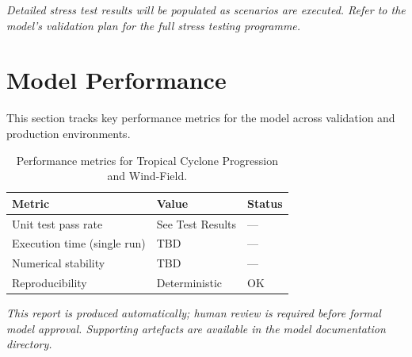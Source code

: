 \documentclass[11pt,a4paper]{article}
\begin{document}
\textit{Detailed stress test results will be populated as scenarios are executed.
Refer to the model's validation plan for the full stress testing programme.}

\section{Model Performance}

This section tracks key performance metrics for the model across
validation and production environments.

\begin{table}[H]
    \centering
    \caption{Performance metrics for Tropical Cyclone Progression and Wind-Field.}
    \begin{tabular}{lll}
        \toprule
        \textbf{Metric} & \textbf{Value} & \textbf{Status} \\
        \midrule
        Unit test pass rate & See Test Results & --- \\
        Execution time (single run) & TBD & --- \\
        Numerical stability & TBD & --- \\
        Reproducibility & Deterministic & OK \\
        \bottomrule
    \end{tabular}
\end{table}

\vspace{12pt}

\noindent\textit{\small This report is produced automatically; human review
is required before formal model approval. Supporting artefacts are available
in the model documentation directory.}
\end{document}
